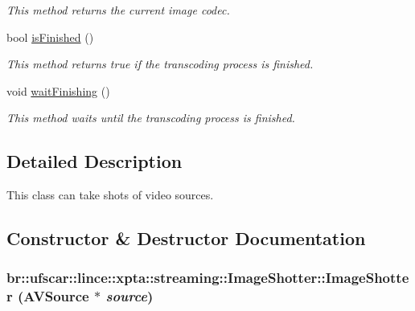 \begin{DoxyCompactItemize}
\begin{DoxyCompactList}\small\item\em This method returns the current image codec. \item\end{DoxyCompactList}\item 
bool \hyperlink{classbr_1_1ufscar_1_1lince_1_1xpta_1_1streaming_1_1ImageShotter_a66d326a0a24e08c4b88e3a07ec1f4c5d}{isFinished} ()
\begin{DoxyCompactList}\small\item\em This method returns true if the transcoding process is finished. \item\end{DoxyCompactList}\item 
void \hyperlink{classbr_1_1ufscar_1_1lince_1_1xpta_1_1streaming_1_1ImageShotter_a68b16838853a0703f75ba80c5b31ee94}{waitFinishing} ()
\begin{DoxyCompactList}\small\item\em This method waits until the transcoding process is finished. \item\end{DoxyCompactList}\end{DoxyCompactItemize}


\subsection{Detailed Description}
This class can take shots of video sources. 

\subsection{Constructor \& Destructor Documentation}
\hypertarget{classbr_1_1ufscar_1_1lince_1_1xpta_1_1streaming_1_1ImageShotter_ad173f44eb1cc0ec3f0e9cb36414f72af}{
\subsubsection[{ImageShotter}]{\setlength{\rightskip}{0pt plus 5cm}br::ufscar::lince::xpta::streaming::ImageShotter::ImageShotter ({\bf AVSource} $\ast$ {\em source})}}
\label{classbr_1_1ufscar_1_1lince_1_1xpta_1_1streaming_1_1ImageShotter_ad173f44eb1cc0ec3f0e9cb36414f72af}


